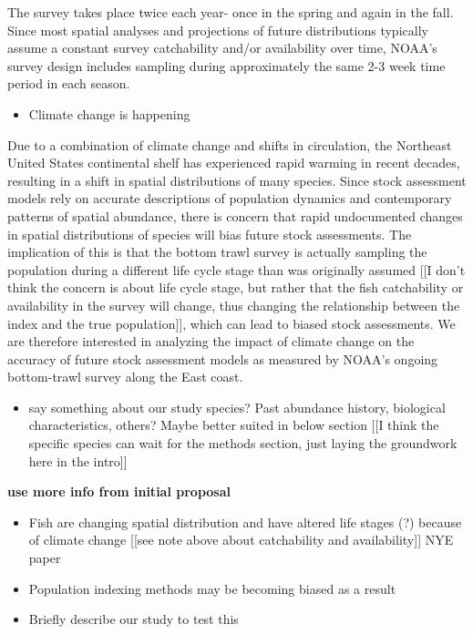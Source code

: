 \documentclass[
  12pt,
]{article}
\providecommand{\tightlist}{%
  \setlength{\itemsep}{0pt}\setlength{\parskip}{0pt}}
\begin{document}
The survey takes place twice each year- once in the spring and again in the fall. Since most spatial analyses and projections of future distributions typically assume a constant survey catchability and/or availability over time, NOAA's survey design includes sampling during approximately the same 2-3 week time period in each season.

\begin{itemize}
\tightlist
\item
  Climate change is happening
\end{itemize}

Due to a combination of climate change and shifts in circulation, the Northeast United States continental shelf has experienced rapid warming in recent decades, resulting in a shift in spatial distributions of many species. Since stock assessment models rely on accurate descriptions of population dynamics and contemporary patterns of spatial abundance, there is concern that rapid undocumented changes in spatial distributions of species will bias future stock assessments. The implication of this is that the bottom trawl survey is actually sampling the population during a different life cycle stage than was originally assumed {[}{[}I don't think the concern is about life cycle stage, but rather that the fish catchability or availability in the survey will change, thus changing the relationship between the index and the true population{]}{]}, which can lead to biased stock assessments. We are therefore interested in analyzing the impact of climate change on the accuracy of future stock assessment models as measured by NOAA's ongoing bottom-trawl survey along the East coast.

\begin{itemize}
\tightlist
\item
  say something about our study species? Past abundance history, biological characteristics, others? Maybe better suited in below section {[}{[}I think the specific species can wait for the methods section, just laying the groundwork here in the intro{]}{]}
\end{itemize}

\textbf{use more info from initial proposal}

\begin{itemize}
\item
  Fish are changing spatial distribution and have altered life stages (?) because of climate change {[}{[}see note above about catchability and availability{]}{]}
  NYE paper
\item
  Population indexing methods may be becoming biased as a result
\item
  Briefly describe our study to test this
\end{itemize}
\end{document}
